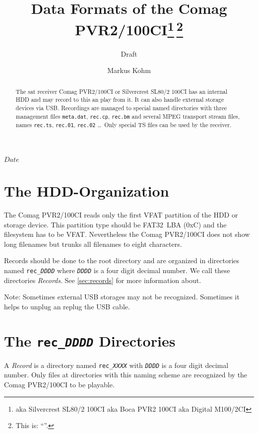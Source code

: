 \documentclass{scrartcl}
\newcommand*{\Comag}{Comag PVR2/100CI\xspace}
\newcommand*{\Silvercrest}{Silvercrest SL80/2 100CI\xspace}
\newcommand*{\Boca}{Boca PVR2 100CI\xspace}
\newcommand*{\Digital}{Digital M100/2CI\xspace}
\begin{document}
\pdfbookmark[1]{\Comag}{title}
\title{Data Formats of the \Comag\footnote{aka
    \Silvercrest aka \Boca aka \Digital}\,\footnote{This is: ``\SVNId''.}}
\subtitle{Draft}
\author{Markus Kohm}
\SVNdate $Date$
\maketitle
\begin{abstract}
  The sat receiver \Comag or \Silvercrest has an internal HDD and may record
  to this an play from it. It can also handle external storage devices via
  USB. Recordings are managed to special named directories with three
  management files \texttt{meta.dat}, \texttt{rec.cp}, \texttt{rec.bm} and
  several MPEG transport stream files, names \texttt{rec.ts}, \texttt{rec.01},
  \texttt{rec.02} \dots\@\ Only special TS files can be used by the receiver.
\end{abstract}

\tableofcontents

\section{The HDD-Organization}
\label{sec:hdd-organization}

The \Comag reads only the first VFAT partition of the HDD or storage
device. This partition type should be FAT32~LBA (0xC) and the filesystem has
to be VFAT. Nevertheless the \Comag does not show long filenames but trunks
all filenames to eight characters.

Records should be done to the root directory and are organized in directories
named \texttt{rec\_\textit{DDDD}} where \texttt{\textit{DDDD}} is a four digit
decimal number. We call these directories \emph{Records}. See
\autoref{sec:records} for more information about.

Note: Sometimes external USB storages may not be recognized. Sometimes it
helps to unplug an replug the USB cable.

\section{The \texttt{rec\_\textit{DDDD}} Directories}
\label{sec:records}

A \emph{Record} is a directory named \texttt{rec\_\textit{XXXX}} with
\texttt{\textit{DDDD}} is a four digit decimal number. Only files at
directories with this naming scheme are recognized by the \Comag to be
playable.
\end{document}
